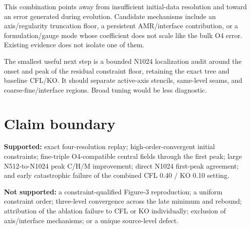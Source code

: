 \documentclass[11pt]{article}
\begin{document}
This combination points away from insufficient initial-data resolution and
toward an error generated during evolution.  Candidate mechanisms include an
axis/regularity truncation floor, a persistent AMR/interface contribution, or
a formulation/gauge mode whose coefficient does not scale like the bulk O4
error.  Existing evidence does not isolate one of them.

The smallest useful next step is a bounded N1024 localization audit around
the onset and peak of the residual constraint floor, retaining the exact tree
and baseline CFL/KO.  It should separate active-axis stencils, same-level
seams, and coarse-fine/interface regions.  Broad tuning would be less
diagnostic.

\section{Claim boundary}

\textbf{Supported:} exact four-resolution replay; high-order-convergent initial
constraints; fine-triple O4-compatible central fields through the first peak;
large N512-to-N1024 peak C/H/M improvement; direct N1024 first-peak agreement;
and early catastrophic failure of the combined CFL 0.40 / KO 0.10 setting.

\textbf{Not supported:} a constraint-qualified Figure-3 reproduction; a
uniform constraint order; three-level convergence across the late minimum and
rebound; attribution of the ablation failure to CFL or KO individually;
exclusion of axis/interface mechanisms; or a unique source-level defect.
\end{document}
